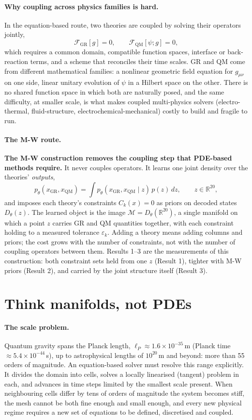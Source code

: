 \documentclass[10pt,twocolumn]{article}
\begin{document}
\paragraph{Why coupling across physics families is hard.}
In the equation-based route, two theories are coupled by solving their operators jointly,
\[
\mathcal F_{\mathrm{GR}}[g]=0,\qquad \mathcal F_{\mathrm{QM}}[\psi;g]=0,
\]
which requires a common domain, compatible function spaces, interface or back-reaction terms,
and a scheme that reconciles their time scales. GR and QM come from different mathematical
families: a nonlinear geometric field equation for $g_{\mu\nu}$ on one side, linear unitary
evolution of $\psi$ in a Hilbert space on the other. There is no shared function space in which
both are naturally posed, and the same difficulty, at smaller scale, is what makes coupled
multi-physics solvers (electro-thermal, fluid-structure, electrochemical-mechanical) costly to
build and fragile to run.

\paragraph{The M-W route.}
\textbf{The M-W construction removes the coupling step that PDE-based methods require.}
It never couples operators. It learns one joint density over the theories'
\emph{outputs},
\[
p_\theta(x_{\mathrm{GR}},x_{\mathrm{QM}})=\int p_\theta(x_{\mathrm{GR}},x_{\mathrm{QM}}\mid z)\,p(z)\,dz,
\qquad z\in\mathbb R^{20},
\]
and imposes each theory's constraints $C_k(x)=0$ as priors on decoded states $D_\theta(z)$. The
learned object is the image $\mathcal M=D_\theta(\mathbb R^{20})$, a single manifold on which a
point $z$ carries GR and QM quantities together, with each constraint holding to a measured
tolerance $\varepsilon_k$. Adding a theory means adding columns and priors; the cost grows with
the number of constraints, not with the number of coupling operators between them. Results 1--3
are the measurements of this construction: both constraint sets held from one $z$ (Result 1),
tighter with M-W priors (Result 2), and carried by the joint structure itself (Result 3).

\section{Think manifolds, not PDEs}
\label{sec:think}
\paragraph{The scale problem.} Quantum gravity spans the Planck length,
$\ell_P\approx1.6\times10^{-35}$\,m (Planck time $\approx5.4\times10^{-44}$\,s), up to
astrophysical lengths of $10^{20}$\,m and beyond: more than 55 orders of magnitude. An
equation-based solver must resolve this range explicitly. It divides the domain into cells,
solves a locally linearised (tangent) problem in each, and advances in time steps limited by the
smallest scale present. When neighbouring cells differ by tens of orders of magnitude the system
becomes stiff, the mesh cannot be both fine enough and small enough, and every new physical
regime requires a new set of equations to be defined, discretised and coupled.
\end{document}
